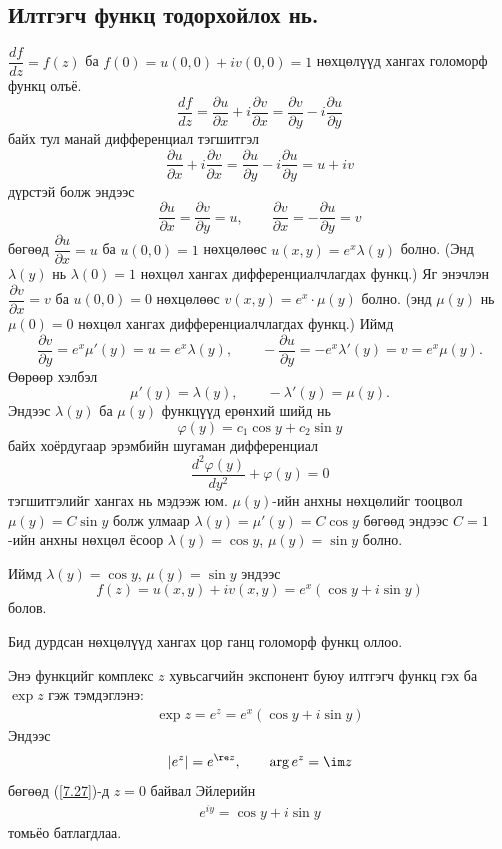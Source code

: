 \subsection{Илтгэгч функц  тодорхойлох нь.}
$\dfrac{df}{dz}=f(z)$ ба $f(0)=u(0,0)+iv(0,0)=1$ нөхцөлүүд хангах голоморф функц олъё. 
$$\frac{df}{dz}=\frac{\partial u}{\partial x}+i\frac{\partial v}{\partial x}=\frac{\partial v}{\partial y}-i\frac{\partial u}{\partial y}$$ 
байх тул манай дифференциал тэгшитгэл
$$\frac{\partial u}{\partial x}+i\frac{\partial v}{\partial x}=\frac{\partial u}{\partial y}-i\frac{\partial u}{\partial y}= u+iv$$
дүрстэй болж эндээс
$$\frac{\partial u}{\partial x}=\frac{\partial v}{\partial y}=u,\qquad \frac{\partial v}{\partial x}=-\frac{\partial u}{\partial y}= v$$
бөгөөд $\dfrac{\partial u}{\partial x}=u$ ба $u(0,0)=1$ нөхцөлөөс $u(x,y)=e^x\lambda (y)$ болно. (Энд $\lambda (y)$ нь $\lambda(0)=1$ нөхцөл хангах дифференциалчлагдах функц.) Яг энэчлэн $\dfrac{\partial v}{\partial x}=v$ ба $u(0,0)=0$ нөхцөлөөс $v(x,y)=e^x\cdot \mu (y)$ болно. (энд $\mu(y)$ нь $\mu(0)=0$ нөхцөл хангах дифференциалчлагдах функц.) Иймд
$$\frac{\partial v}{\partial y}=e^x \mu'(y)=u=e^x\lambda(y), \qquad -\frac{\partial u}{\partial y}=-e^x \lambda'(y)=v=e^x\mu(y). $$
Өөрөөр хэлбэл
$$\mu'(y)=\lambda (y), \qquad -\lambda '(y)=\mu (y).$$
Эндээс $\lambda(y)$ ба $\mu(y)$ функцүүд ерөнхий шийд нь
$$\varphi (y)=c_1\cos y+c_2\sin y$$
байх хоёрдугаар эрэмбийн шугаман дифференциал
$$\frac{d^2\varphi(y)}{dy^2}+\varphi (y)=0$$
тэгшитгэлийг хангах нь мэдээж юм. $\mu (y)$-ийн анхны нөхцөлийг тооцвол $\mu(y)=C\sin y$ болж улмаар $\lambda (y)=\mu '(y)=C\cos y$ бөгөөд эндээс $C=1$-ийн анхны нөхцөл ёсоор $\lambda(y)=\cos y$, $\mu (y)=\sin y$ болно.

Иймд  $\lambda (y)=\cos y$, $\mu(y)=\sin y$ эндээс
$$f(z)=u(x,y)+iv(x,y)=e^x(\cos y +i\sin y)$$ болов. 

Бид дурдсан нөхцөлүүд хангах цор ганц голоморф функц оллоо.

Энэ функцийг комплекс $z$ хувьсагчийн экспонент буюу илтгэгч функц гэх ба $\exp z$ гэж тэмдэглэнэ:
\begin{eqnarray} \label{7.27}
\exp z=e^z=e^x(\cos y +i\sin y)
\end{eqnarray}
Эндээс 
\begin{eqnarray}
|e^z|=e^{\re z}, \qquad \arg  e^z=\im z
\end{eqnarray}
бөгөөд (\ref{7.27})-д $z=0$ байвал Эйлерийн
\begin{eqnarray}
e^{iy}=\cos y +i\sin y
\end{eqnarray}
томьёо батлагдлаа.

